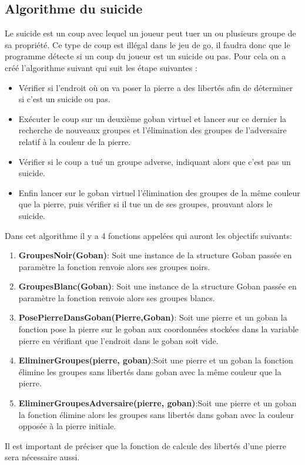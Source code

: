     \subsection{Algorithme du suicide}
    Le suicide est un coup avec lequel un joueur peut tuer un ou plusieurs groupe de sa propriété. Ce type de coup est illégal dans le jeu de go, il faudra donc que le programme détecte si un coup du joueur est un suicide ou pas. Pour cela on a créé l'algorithme suivant qui suit les étape suivantes :\\
        \begin{itemize}
            \item Vérifier si l'endroit où on va poser la pierre a des libertés afin de déterminer si c'est un suicide ou pas.
            \item Exécuter le coup sur un deuxième goban virtuel et lancer sur ce dernier la recherche de nouveaux groupes et l'élimination des groupes de l'adversaire relatif à la couleur de la pierre.
            \item Vérifier si le coup a tué un groupe adverse, indiquant alors que c'est pas un suicide.
            \item Enfin lancer sur le goban virtuel l'élimination des groupes de la même couleur que la pierre, puis vérifier si il tue un de ses groupes, prouvant alors le suicide.
        \end{itemize}
        Dans cet algorithme il y a 4 fonctions appelées qui auront les objectifs suivants:\\
        \begin{enumerate}
            \item \textbf{GroupesNoir(Goban)}: Soit une instance de la structure Goban passée en paramètre la fonction renvoie alors ses groupes noirs.
            \item \textbf{GroupesBlanc(Goban)}: Soit une instance de la structure Goban passée en paramètre la fonction renvoie alors ses groupes blancs.
            \item \textbf{PosePierreDansGoban(Pierre,Goban)}: Soit  une pierre et un goban la fonction pose la pierre sur le goban aux coordonnées stockées dans la variable pierre en vérifiant que l'endroit dans le goban soit vide.
            \item \textbf{EliminerGroupes(pierre, goban)}:Soit une pierre et un goban la fonction élimine les groupes sans libertés dans goban avec la même couleur que la pierre. 
            \item \textbf{EliminerGroupesAdversaire(pierre, goban)}:Soit une pierre et un goban la fonction élimine alors les groupes sans libertés dans goban avec la couleur opposée à la pierre initiale. 
        \end{enumerate}
        Il est important de préciser que la fonction de calcule des libertés d'une pierre sera nécessaire aussi.
    
